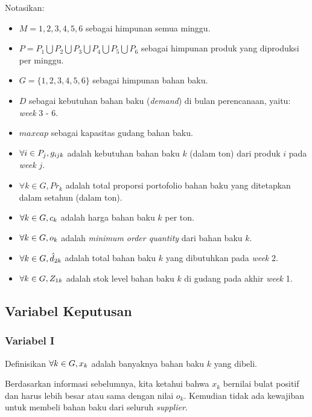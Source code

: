 \documentclass[
  12pt,
]{article}
\providecommand{\tightlist}{%
  \setlength{\itemsep}{0pt}\setlength{\parskip}{0pt}}
\begin{document}
Notasikan:

\begin{itemize}
\tightlist
\item
  \(M = {1,2,3,4,5,6}\) sebagai himpunan semua minggu.
\item
  \(P = P_1 \bigcup P_2 \bigcup P_3 \bigcup P_4 \bigcup P_5 \bigcup P_6\)
  sebagai himpunan produk yang diproduksi per minggu.
\item
  \(G = \{1,2,3,4,5,6\}\) sebagai himpunan bahan baku.
\item
  \(D\) sebagai kebutuhan bahan baku (\emph{demand}) di bulan
  perencanaan, yaitu: \emph{week} 3 - 6.
\item
  \(maxcap\) sebagai kapasitas gudang bahan baku.
\item
  \(\forall i \in P_j, \space g_{ijk}\) adalah kebutuhan bahan baku
  \(k\) (dalam ton) dari produk \(i\) pada \emph{week} \(j\).
\item
  \(\forall k \in G, Pr_k\) adalah total proporsi portofolio bahan baku
  yang ditetapkan dalam setahun (dalam ton).
\item
  \(\forall k \in G, \space c_k\) adalah harga bahan baku \(k\) per ton.
\item
  \(\forall k \in G, \space o_k\) adalah \emph{minimum order quantity}
  dari bahan baku \(k\).
\item
  \(\forall k \in G, \space \hat{d}_{2k}\) adalah total bahan baku \(k\)
  yang dibutuhkan pada \emph{week} 2.
\item
  \(\forall k \in G, \space Z_{1k}\) adalah stok level bahan baku \(k\)
  di gudang pada akhir \emph{week} 1.
\end{itemize}

\hypertarget{variabel-keputusan}{%
\subsection{Variabel Keputusan}\label{variabel-keputusan}}

\hypertarget{variabel-i}{%
\subsubsection*{Variabel I}\label{variabel-i}}

Definisikan \(\forall k \in G, \space x_k\) adalah banyaknya bahan baku
\(k\) yang dibeli.

Berdasarkan informasi sebelumnya, kita ketahui bahwa \(x_k\) bernilai
bulat positif dan harus lebih besar atau sama dengan nilai \(o_k\).
Kemudian tidak ada kewajiban untuk membeli bahan baku dari seluruh
\emph{supplier}.
\end{document}

